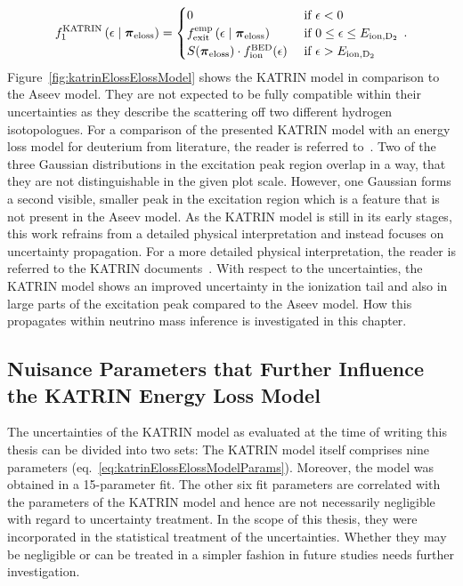 \begin{equation}
	f_1^\mathrm{KATRIN}
	\giventhat*{\epsilon}{\nuisanceParamVec_\mathrm{eloss}} = 
	\begin{cases}
	0
	&\text{ if } \epsilon < 0 \\
	\katrinElossPhen{\epsilon}
	&\text{ if } 0 \leq \epsilon \leq E_\mathrm{ion,D_2} \\
	\katrinElossScaleFactor \cdot \katrinElossBDE{\epsilon} 
	&\text{ if } \epsilon > E_\mathrm{ion,D_2}
	\end{cases}
	\fullstop
\end{equation}
Figure~\ref{fig:katrinElossElossModel} shows the KATRIN model in comparison to the Aseev model. They are not expected to be fully compatible within their uncertainties as they describe the scattering off two different hydrogen isotopologues. For a comparison of the presented KATRIN model with an energy loss model for deuterium from literature, the reader is referred to~\cite{Rodenbeck2019}. Two of the three Gaussian distributions in the excitation peak region overlap in a way, that they are not distinguishable in the given plot scale. However, one Gaussian forms a second visible, smaller peak in the excitation region which is a feature that is not present in the Aseev model. As the KATRIN model is still in its early stages, this work refrains from a detailed physical interpretation and instead focuses on uncertainty propagation. For a more detailed physical interpretation, the reader is referred to the KATRIN documents~\cite{Rodenbeck2019,Hannen2019_1,Hannen2019_2}. With respect to the uncertainties, the KATRIN model shows an improved uncertainty in the ionization tail and also in large parts of the excitation peak compared to the Aseev model. How this propagates within neutrino mass inference is investigated in this chapter.

\subsection{Nuisance Parameters that Further Influence the KATRIN Energy Loss Model}
\label{sec:katrinElossModelNuisanceParametrization}
The uncertainties of the KATRIN model as evaluated at the time of writing this thesis can be divided into two sets: The KATRIN model itself comprises nine parameters (eq.~\ref{eq:katrinElossElossModelParams}). Moreover, the model was obtained in a 15-parameter fit. The other six fit parameters are correlated with the parameters of the KATRIN model and hence are not necessarily negligible with regard to uncertainty treatment. In the scope of this thesis, they were incorporated in the statistical treatment of the uncertainties. Whether they may be negligible or can be treated in a simpler fashion in future studies needs further investigation. 

